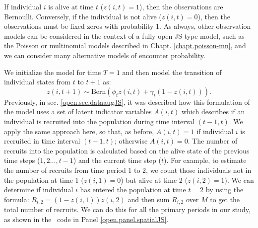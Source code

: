 If individual $i$ is alive at time $t$ ($z(i,t)=1$), then the
observations are Bernoulli.  Conversely, if the individual is not
alive ($z(i,t)=0$), then the observations must be fixed zeros with
probability 1.  As always, other observation models can be considered
in the context of a fully open JS type model, such as the Poisson or
multinomial models described in Chapt. \ref{chapt.poisson-mn}, and we
can consider many alternative models of encounter probability.

We initialize the
model for time $T=1$
and then model the transition of individual states from
$t$ to $t+1$ as:
\[
 z(i,t+1) \sim \mbox{Bern}( \phi_t z(i,t)  + \gamma_t (1-z(i,t)) ).
\]
Previously, in sec. \ref{open.sec.dataaugJS}, it was described how
this formulation of the model uses a set of latent indicator variables
$A(i,t)$ which describes if an individual is recruited into the
population during time interval $(t-1, t)$.  We apply the same
approach here, so that, as before, $A(i,t) = 1$ if individual $i$ is
recruited in time interval $(t-1, t)$; otherwise $A(i,t)=0$.
The number of recruits into the population is calculated based on the
alive state of the previous time steps ($1, 2 \dots, t-1$) and the
current time step ($t$).  For example, to estimate the number of
recruits from time period 1 to 2, we count those individuals not in
the population at time 1 ($z(i,1) = 0$) but alive at time 2 ($z(i,2) =
1$).  We can determine if individual $i$ has entered the population at
time $t=2$ by using the formula: $R_{i,2}=(1-z(i,1))z(i,2)$ and then
sum $R_{i,2}$ over $M$ to get the total number of recruits.  We can do
this for all the primary periods in our study, as shown in the
\jags~code in Panel \ref{open.panel.spatialJS}.


